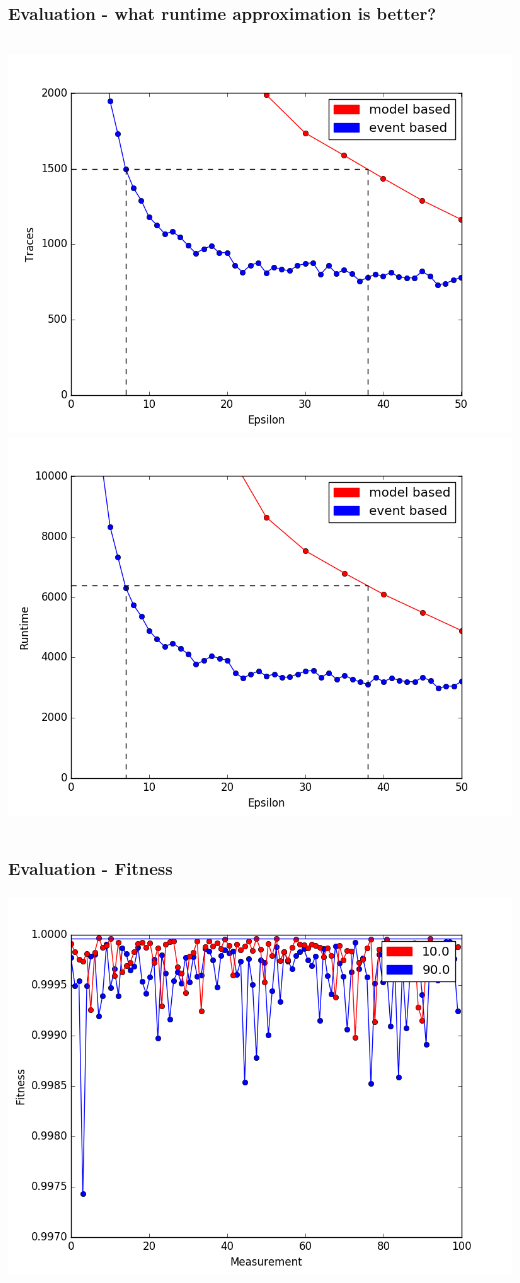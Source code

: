 \documentclass{beamer}
\begin{document}
\begin{frame}
\frametitle{Evaluation - what runtime approximation is better?}
\begin{columns}
\includegraphics[width=0.95\linewidth]{data/lax_vs_strict_traces_epsilon_zoomed.png}
\includegraphics[width=0.95\linewidth]{data/kax_vs_strict_runtime_zoomed.png}
\end{columns}
\end{frame}

\begin{frame}
\frametitle{Evaluation - Fitness}
\centering
\includegraphics[width=0.5\linewidth]{data/BPI2014/lax_10_90_fitness.png}
\end{frame}
\end{document}
